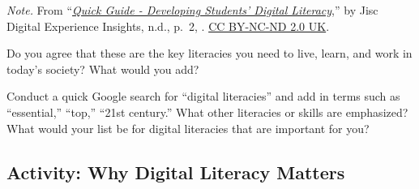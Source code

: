 \documentclass[
  letterpaper,
  DIV=11,
  numbers=noendperiod]{scrreprt}
\begin{document}
\begin{tcolorbox}
\begin{figure}[H]
\end{figure}%

\begin{tcolorbox}[enhanced jigsaw, toprule=.15mm, colback=white, colframe=quarto-callout-note-color-frame, arc=.35mm, opacityback=0, breakable, rightrule=.15mm, bottomrule=.15mm, leftrule=.75mm, left=2mm]

\emph{Note.} From
``\href{https://digitalcapability.jiscinvolve.org/wp/files/2014/09/JISC_REPORT_Digital_Literacies_280714_PRINT.pdf}{\emph{Quick
Guide - Developing Students' Digital Literacy}},'' by Jisc Digital
Experience Insights, n.d., p.~2, .
\href{https://creativecommons.org/licenses/by-nc-nd/2.0/uk/}{CC BY-NC-ND
2.0 UK}.

\end{tcolorbox}

Do you agree that these are the key literacies you need to live, learn,
and work in today's society? What would you add?

Conduct a quick Google search for ``digital literacies'' and add in
terms such as ``essential,'' ``top,'' ``21st century.'' What other
literacies or skills are emphasized? What would your list be for digital
literacies that are important for you?

\end{tcolorbox}

\subsection{Activity: Why Digital Literacy
Matters}\label{activity-why-digital-literacy-matters}
\end{document}
